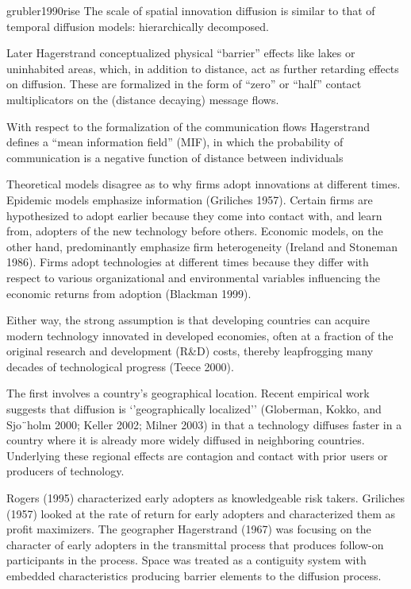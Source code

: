 \documentclass[preprint, 3p,
authoryear]{elsarticle} %
\begin{document}
grubler1990rise The scale of spatial innovation diffusion is similar to
that of temporal diffusion models: hierarchically decomposed.

\citet{grubler1990rise} Later Hagerstrand conceptualized physical
``barrier'' effects like lakes or uninhabited areas, which, in addition
to distance, act as further retarding effects on diffusion. These are
formalized in the form of ``zero'' or ``half'' contact multiplicators on
the (distance decaying) message flows.

\citet{grubler1990rise} With respect to the formalization of the
communication flows Hagerstrand defines a ``mean information field''
(MIF), in which the probability of communication is a negative function
of distance between individuals

\citet{perkins2005international} Theoretical models disagree as to why
firms adopt innovations at different times. Epidemic models emphasize
information (Griliches 1957). Certain firms are hypothesized to adopt
earlier because they come into contact with, and learn from, adopters of
the new technology before others. Economic models, on the other hand,
predominantly emphasize firm heterogeneity (Ireland and Stoneman 1986).
Firms adopt technologies at different times because they differ with
respect to various organizational and environmental variables
influencing the economic returns from adoption (Blackman 1999).

Either way, the strong assumption is that developing countries can
acquire modern technology innovated in developed economies, often at a
fraction of the original research and development (R\&D) costs, thereby
leapfrogging many decades of technological progress (Teece 2000).

The first involves a country's geographical location. Recent empirical
work suggests that diffusion is `'geographically localized'' (Globerman,
Kokko, and Sjo¨holm 2000; Keller 2002; Milner 2003) in that a technology
diffuses faster in a country where it is already more widely diffused in
neighboring countries. Underlying these regional effects are contagion
and contact with prior users or producers of technology.

\citet{ding2010modeling} Rogers (1995) characterized early adopters as
knowledgeable risk takers. Griliches (1957) looked at the rate of return
for early adopters and characterized them as profit maximizers. The
geographer Hagerstrand (1967) was focusing on the character of early
adopters in the transmittal process that produces follow-on participants
in the process. Space was treated as a contiguity system with embedded
characteristics producing barrier elements to the diffusion process.
\end{document}
